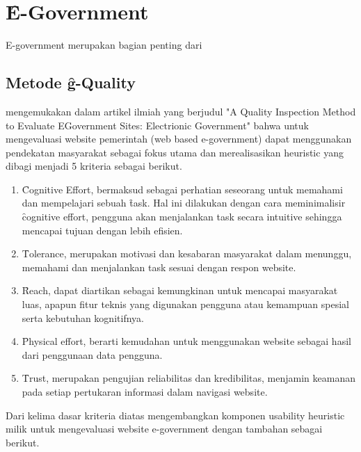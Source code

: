 \section{\f{E-Government}}
E-government merupakan bagian penting dari
\subsection{Metode \f{g-Quality}}\label{subsec:gquality}
\citet{paper.garcia} mengemukakan dalam artikel ilmiah yang berjudul "A Quality Inspection Method to Evaluate EGovernment Sites: Electrionic Government" bahwa untuk mengevaluasi website pemerintah (web based e-government) dapat menggunakan pendekatan masyarakat sebagai fokus utama dan merealisasikan heuristic yang dibagi menjadi 5 kriteria sebagai berikut.
\begin{enumerate}
	\item \f{Cognitive Effort}, bermaksud sebagai perhatian seseorang untuk memahami dan mempelajari sebuah \f{task}. Hal ini dilakukan dengan cara meminimalisir \f{cognitive effort}, pengguna akan menjalankan task secara intuitive sehingga mencapai tujuan dengan lebih efisien. 
	\item \f{Tolerance}, merupakan motivasi dan kesabaran masyarakat dalam menunggu, memahami dan menjalankan task sesuai dengan respon website.
	\item \f{Reach}, dapat diartikan sebagai kemungkinan untuk mencapai masyarakat luas, apapun fitur teknis yang digunakan pengguna atau kemampuan spesial serta kebutuhan kognitifnya. 
	\item \f{Physical effort}, berarti kemudahan untuk menggunakan website sebagai hasil dari penggunaan data pengguna.
	\item \f{Trust}, merupakan pengujian reliabilitas dan kredibilitas, menjamin keamanan pada setiap pertukaran informasi dalam navigasi website.
\end{enumerate}
Dari kelima dasar kriteria diatas \citeauthor{} mengembangkan komponen usability heuristic milik \citeauthor{} untuk mengevaluasi website e-government dengan tambahan sebagai berikut.
